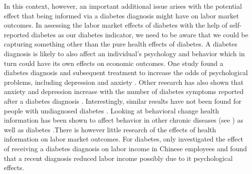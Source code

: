 \documentclass[12pt,english,british]{article}
\begin{document}
In this context, however, an important additional issue arises with the potential effect that being informed via a diabetes diagnosis
might have on labor market outcomes. In assessing the labor market
effects of diabetes with the help of self-reported diabetes as our
diabetes indicator, we need to be aware that we could be capturing 
something other than the pure health effects of diabetes.  A diabetes
diagnosis is likely to also affect an individual's psychology and
behavior which in turn could have its own effects on economic
outcomes. One study found a diabetes diagnosis and subsequent treatment
to increase the odds of psychological problems, including depression
and anxiety \citep{Thoolen2006a}. Other research has also shown that
anxiety and depression increase with the number of diabetes symptoms
reported after a diabetes diagnosis \cite{Paddison_2011}.
Interestingly, similar results have not been found for people with
undiagnosed diabetes \citep{Nouwen2011}. Looking at behavioral change health information has been shown to affect behavior in other chronic diseases (see \citep{Baird2014,Gong2015,Thornton2008,Zhao2013a}) as well as diabetes \citep{Slade2012}.There is however little research of the effects of health information on labor market outcomes. For diabetes, only \citet{Liu2014} investigated the effect of receiving a diabetes diagnosis on labor income
in Chinese employees and found that a recent diagnosis  reduced labor income possibly due to it psychological effects. 
\end{document}
